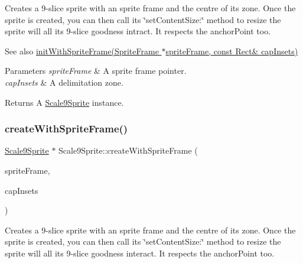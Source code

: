 Creates a 9-\/slice sprite with an sprite frame and the centre of its zone. Once the sprite is created, you can then call its \char`\"{}set\+Content\+Size\+:\char`\"{} method to resize the sprite will all it\textquotesingle{}s 9-\/slice goodness intract. It respects the anchor\+Point too.

\begin{DoxySeeAlso}{See also}
\hyperlink{classui_1_1Scale9Sprite_ade227fd72fa88fc071803260cac0d9b5}{init\+With\+Sprite\+Frame(\+Sprite\+Frame $\ast$sprite\+Frame, const Rect\& cap\+Insets)} 
\end{DoxySeeAlso}

\begin{DoxyParams}{Parameters}
{\em sprite\+Frame} & A sprite frame pointer. \\
\hline
{\em cap\+Insets} & A delimitation zone. \\
\hline
\end{DoxyParams}
\begin{DoxyReturn}{Returns}
A \hyperlink{classui_1_1Scale9Sprite}{Scale9\+Sprite} instance. 
\end{DoxyReturn}
\mbox{\label{classui_1_1Scale9Sprite_a551c0aff617e8ee2ba305fff991a0599}} 
\subsubsection{\texorpdfstring{create\+With\+Sprite\+Frame()}{createWithSpriteFrame()}\hspace{0.1cm}{\footnotesize\ttfamily [4/4]}}
{\footnotesize\ttfamily \hyperlink{classui_1_1Scale9Sprite}{Scale9\+Sprite} $\ast$ Scale9\+Sprite\+::create\+With\+Sprite\+Frame (\begin{DoxyParamCaption}\item[{\hyperlink{classSpriteFrame}{Sprite\+Frame} $\ast$}]{sprite\+Frame,  }\item[{const \hyperlink{classRect}{Rect} \&}]{cap\+Insets }\end{DoxyParamCaption})\hspace{0.3cm}{\ttfamily [static]}}

Creates a 9-\/slice sprite with an sprite frame and the centre of its zone. Once the sprite is created, you can then call its \char`\"{}set\+Content\+Size\+:\char`\"{} method to resize the sprite will all it\textquotesingle{}s 9-\/slice goodness interact. It respects the anchor\+Point too.

